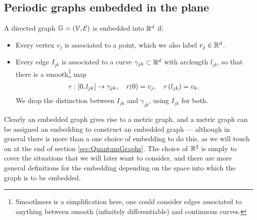 \subsection{Periodic graphs embedded in the plane} \label{ssec:EmbeddedGraphs}
A directed graph $\mathbb{G}=\left( \mathcal{V}, \mathcal{E} \right)$ is embedded into $\mathbb{R}^d$ if:
\begin{itemize}
	\item Every vertex $v_j$ is associated to a point, which we also label $v_j\in\mathbb{R}^d$.
	\item Every edge $I_{jk}$ is associated to a curve $\gamma_{jk}\subset\mathbb{R}^d$ with arclength $l_{jk}$, so that there is a smooth\footnote{Smoothness is a simplification here, one could consider edges associated to anything between smooth (infinitely differentiable) and continuous curves.} map
	\begin{align} \label{eq:GeneralCurveParam}
		r: \left[ 0,l_{jk} \right] \rightarrow \gamma_{jk}, \quad r(0) = v_j, \quad r\left( l_{jk} \right) = v_k.
	\end{align}
	We drop the distinction between $I_{jk}$ and $\gamma_{jk}$, using $I_{jk}$ for both.
\end{itemize}
Clearly an embedded graph gives rise to a metric graph, and a metric graph can be assigned an embedding to construct an embedded graph --- although in general there is more than a one choice of embedding to do this, as we will touch on at the end of section \ref{sec:QuantumGraphs}.
The choice of $\mathbb{R}^2$ is simply to cover the situations that we will later want to consider, and there are more general definitions for the embedding depending on the space into which the graph is to be embedded.


